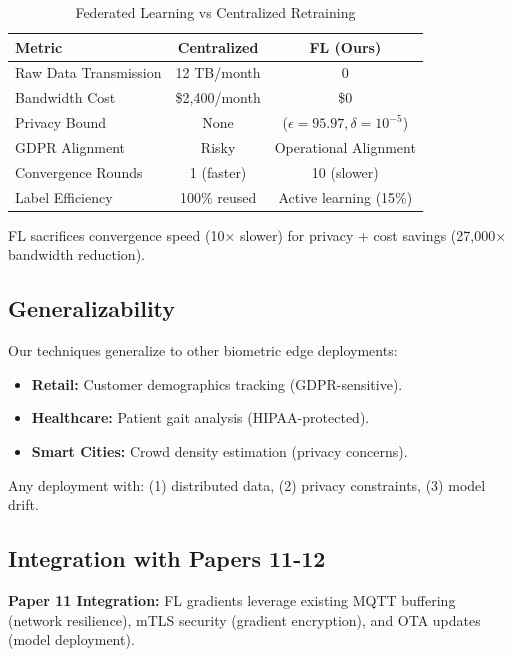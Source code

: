 \documentclass[conference]{IEEEtran}
\begin{document}
\begin{table}[h]
\caption{Federated Learning vs Centralized Retraining}
\begin{center}
\begin{tabular}{lcc}
\toprule
\textbf{Metric} & \textbf{Centralized} & \textbf{FL (Ours)} \\
\midrule
Raw Data Transmission & 12 TB/month & 0 \\
Bandwidth Cost & \$2,400/month & \$0 \\
Privacy Bound & None & ($\epsilon=95.97, \delta=10^{-5}$) \\
GDPR Alignment & Risky & Operational Alignment \\
Convergence Rounds & 1 (faster) & 10 (slower) \\
Label Efficiency & 100\% reused & Active learning (15\%) \\
\bottomrule
\end{tabular}
\end{center}
\label{tab:comparison}
\end{table}

FL sacrifices convergence speed (10× slower) for privacy + cost savings (27,000× bandwidth reduction).

\subsection{Generalizability}

Our techniques generalize to other biometric edge deployments:
\begin{itemize}
    \item \textbf{Retail:} Customer demographics tracking (GDPR-sensitive).
    \item \textbf{Healthcare:} Patient gait analysis (HIPAA-protected).
    \item \textbf{Smart Cities:} Crowd density estimation (privacy concerns).
\end{itemize}

Any deployment with: (1) distributed data, (2) privacy constraints, (3) model drift.

\subsection{Integration with Papers 11-12}

\textbf{Paper 11 Integration:} FL gradients leverage existing MQTT buffering (network resilience), mTLS security (gradient encryption), and OTA updates (model deployment).
\end{document}
